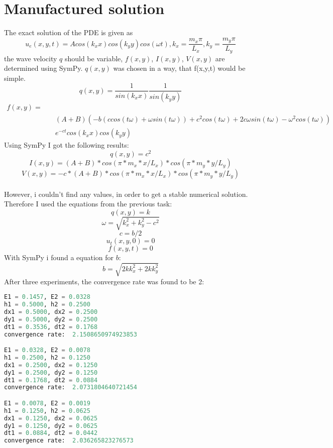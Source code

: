 \documentclass{report}
\begin{document}
        \section*{Manufactured solution}
        The exact solution of the PDE is given as $$u_e(x,y,t)=A cos(k_x x)cos(k_y y) cos(\omega t),  k_x=\frac{m_x\pi}{L_x}, k_y=\frac{m_y\pi}{L_y}$$
        the wave velocity $q$ should be variable, $f(x,y)$, $I(x,y)$, $V(x,y)$ are determined using SymPy. $q(x,y)$ was chosen in a way, that f(x,y,t) would be simple.
        $$q(x,y) = \frac {1}{sin(k_x x)} \frac{1}{sin(k_y y)}$$
        \begin{equation}
        \begin{split}
        f(x,y) = \\
        &\quad (A + B) (-b (c cos(t \omega) + \omega sin(t \omega)) + c^2 cos(t \omega) + 2 c \omega sin(t \omega) - \omega ^2 cos(t \omega)) \\
        &\quad e^{-c t} cos(k_x x) cos(k_y y)
        \end{split}
        \end{equation}
        Using SymPy I got the following results:
        $$q(x,y) = c^2$$ 
        $$I(x, y) =  (A + B)*cos(\pi*m_x*x/L_x)*cos(\pi*m_y*y/L_y)$$
        $$V(x, y) =  -c*(A + B)*cos(\pi*m_x*x/L_x)*cos(\pi*m_y*y/L_y)$$\\
        However, i couldn't find any values, in order to get a stable numerical solution. Therefore I used the equations from the previous task:
        $$q(x,y)=k$$
        $$\omega = \sqrt{k_x^2+k_y^2-c^2}$$ $$c=b/2$$
        $$u_t(x,y,0) = 0$$
        $$f(x,y,t) = 0$$
        With SymPy i found a equation for $b$:
        $$b = \sqrt{2 k k_x^2 + 2 k k_y^2}$$
        After three experiments, the convergence rate was found to be 2:
        \begin{lstlisting}[language=Python]
E1 = 0.1457, E2 = 0.0328
h1 = 0.5000, h2 = 0.2500
dx1 = 0.5000, dx2 = 0.2500
dy1 = 0.5000, dy2 = 0.2500
dt1 = 0.3536, dt2 = 0.1768
convergence rate:  2.1508650974923853

E1 = 0.0328, E2 = 0.0078
h1 = 0.2500, h2 = 0.1250
dx1 = 0.2500, dx2 = 0.1250
dy1 = 0.2500, dy2 = 0.1250
dt1 = 0.1768, dt2 = 0.0884
convergence rate:  2.0731804640721454

E1 = 0.0078, E2 = 0.0019
h1 = 0.1250, h2 = 0.0625
dx1 = 0.1250, dx2 = 0.0625
dy1 = 0.1250, dy2 = 0.0625
dt1 = 0.0884, dt2 = 0.0442
convergence rate:  2.036265823276573
        \end{lstlisting}
        
\end{document}
